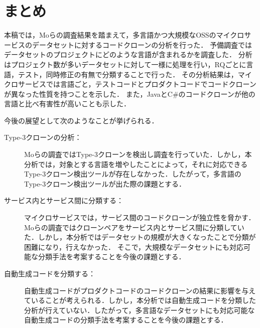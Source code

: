 \documentclass[T,J]{fose}
\begin{document}
\section{まとめ}
本稿では，Moらの調査結果を踏まえて，多言語かつ大規模なOSSのマイクロサービスのデータセットに対するコードクローンの分析を行った\cite{mo2021existence}．
予備調査ではデータセットのプロジェクトにどのような言語が含まれるかを調査した．
分析はプロジェクト数が多いデータセットに対して一様に処理を行い，RQごとに言語，テスト，同時修正の有無で分類することで行った．
その分析結果は，マイクロサービスでは言語ごと，テストコードとプロダクトコードでコードクローンが異なった性質を持つことを示した．
また，JavaとC\#のコードクローンが他の言語と比べ有害性が高いことも示した．

今後の展望として次のようなことが挙げられる．
\begin{description}
    \item[Type-3クローンの分析：] 
    Moらの調査ではType-3クローンを検出し調査を行っていた．しかし，本分析では，対象とする言語を増やしたことによって，それに対応できるType-3クローン検出ツールが存在しなかった．したがって，多言語のType-3クローン検出ツールが出た際の課題とする．
    \item[サービス内とサービス間に分類する：] 
    マイクロサービスでは，サービス間のコードクローンが独立性を脅かす．Moらの調査ではクローンペアをサービス内とサービス間に分類していた．しかし，本分析ではデータセットの規模が大きくなったことで分類が困難になり，行えなかった． そこで，大規模なデータセットにも対応可能な分類手法を考案することを今後の課題とする．
    \item[自動生成コードを分類する：] 
    自動生成コードがプロダクトコードのコードクローンの結果に影響を与えていることが考えられる．しかし，本分析では自動生成コードを分類した分析が行えていない．したがって，多言語なデータセットにも対応可能な自動生成コードの分類手法を考案することを今後の課題とする．
\end{description}



\end{document}
